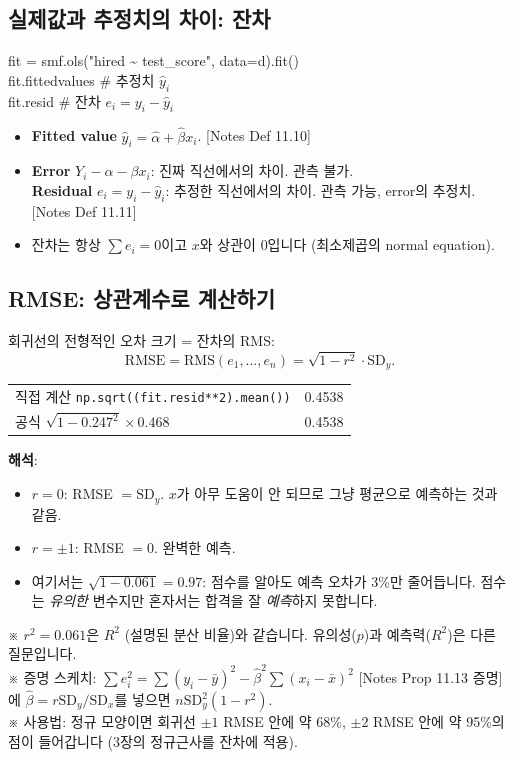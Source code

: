 \documentclass[11pt,a4paper]{article}
\newcommand{\SD}{\mathrm{SD}}
\newcommand{\term}[1]{\textbf{#1}}
\newcommand{\code}[1]{\texttt{#1}}
\newcommand{\nref}[1]{{\footnotesize\textsf{\color{blue!55!black}[Notes #1]}}}
\newcommand{\aside}[1]{{\footnotesize\color{black!65}#1}}
\begin{document}
\subsection{실제값과 추정치의 차이: 잔차}
\begin{codebox}
fit = smf.ols("hired \~{} test\_score", data=d).fit()\\
fit.fittedvalues \hfill \# 추정치 $\hat y_i$\\
fit.resid \hfill \# 잔차 $e_i=y_i-\hat y_i$
\end{codebox}
\begin{itemize}
\item \term{Fitted value} $\hat y_i=\hat\alpha+\hat\beta x_i$. \nref{Def 11.10}
\item \term{Error} $Y_i-\alpha-\beta x_i$: 진짜 직선에서의 차이. 관측 불가.\\
\term{Residual} $e_i=y_i-\hat y_i$: 추정한 직선에서의 차이. 관측 가능, error의 추정치. \nref{Def 11.11}
\item 잔차는 항상 $\sum e_i=0$이고 $x$와 상관이 0입니다 (최소제곱의 normal equation).
\end{itemize}

\subsection{RMSE: 상관계수로 계산하기}
회귀선의 전형적인 오차 크기 = 잔차의 RMS:
\[
\text{RMSE}=\text{RMS}(e_1,\dots,e_n)=\sqrt{1-r^2}\cdot\SD_y.
\]
\begin{center}
\begin{tabular}{@{}l c@{}}
\toprule
직접 계산 \code{np.sqrt((fit.resid**2).mean())} & 0.4538 \\
공식 $\sqrt{1-0.247^2}\times0.468$ & 0.4538 \\
\bottomrule
\end{tabular}
\end{center}
\textbf{해석}:
\begin{itemize}
\item $r=0$: RMSE $=\SD_y$. $x$가 아무 도움이 안 되므로 그냥 평균으로 예측하는 것과 같음.
\item $r=\pm1$: RMSE $=0$. 완벽한 예측.
\item 여기서는 $\sqrt{1-0.061}=0.97$: 점수를 알아도 예측 오차가 3\%만 줄어듭니다. 점수는 \emph{유의한} 변수지만 혼자서는 합격을 잘 \emph{예측}하지 못합니다.
\end{itemize}
\aside{※ $r^2=0.061$은 \term{$R^2$} (설명된 분산 비율)와 같습니다. 유의성($p$)과 예측력($R^2$)은 다른 질문입니다.}\\
\aside{※ 증명 스케치: $\sum e_i^2=\sum(y_i-\bar y)^2-\hat\beta^2\sum(x_i-\bar x)^2$ \nref{Prop 11.13 증명}에 $\hat\beta=r\SD_y/\SD_x$를 넣으면 $n\SD_y^2(1-r^2)$.}\\
\aside{※ 사용법: 정규 모양이면 회귀선 $\pm1$ RMSE 안에 약 68\%, $\pm2$ RMSE 안에 약 95\%의 점이 들어갑니다 (3장의 정규근사를 잔차에 적용).}
\end{document}
